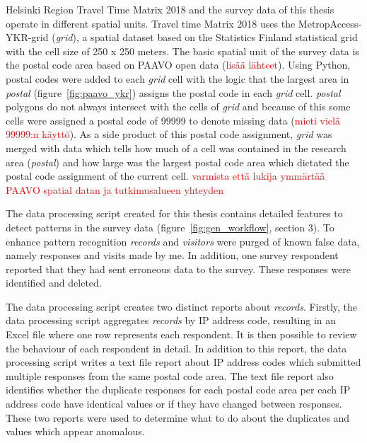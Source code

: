Helsinki Region Travel Time Matrix 2018 and the survey data of this thesis operate in different spatial units. Travel time Matrix 2018 uses the MetropAccess-YKR-grid (\textit{grid}), a spatial dataset based on the Statistics Finland statistical grid with the cell size of 250 x 250 meters. The basic spatial unit of the survey data is the postal code area based on PAAVO open data (\textcolor{red}{lisää lähteet}). Using Python, postal codes were added to each \textit{grid} cell with the logic that the largest area in \textit{postal} (figure~\ref{fig:paavo_ykr}) assigns the postal code in each \textit{grid} cell. \textit{postal} polygons do not always intersect with the cells of \textit{grid} and because of this some cells were assigned a postal code of 99999 to denote missing data (\textcolor{red}{mieti vielä 99999:n käyttö}). As a side product of this postal code assignment, \textit{grid} was merged with data which tells how much of a cell was contained in the research area (\textit{postal}) and how large was the largest postal code area which dictated the postal code assignment of the current cell. \textcolor{red}{varmista että lukija ymmärtää PAAVO spatial datan ja tutkimusalueen yhteyden}

The data processing script created for this thesis contains detailed features to detect patterns in the survey data (figure~\ref{fig:gen_workflow}, section 3). To enhance pattern recognition \textit{records} and \textit{visitors} were purged of known false data, namely responses and visits made by me. In addition, one survey respondent reported that they had sent erroneous data to the survey. These responses were identified and deleted.

The data processing script creates two distinct reports about \textit{records}. Firstly, the data processing script aggregates \textit{records} by IP address code, resulting in an Excel file where one row represents each respondent. It is then possible to review the behaviour of each respondent in detail. In addition to this report, the data processing script writes a text file report about IP address codes which submitted multiple responses from the same postal code area. The text file report also identifies whether the duplicate responses for each postal code area per each IP address code have identical values or if they have changed between responses. These two reports were used to determine what to do about the duplicates and values which appear anomalous.


